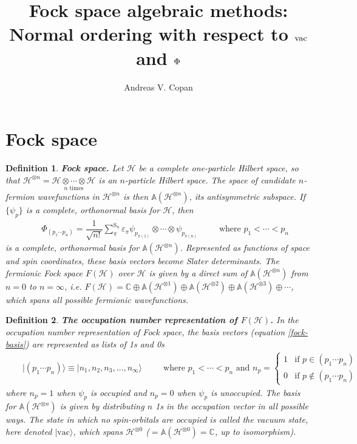\documentclass[11pt,fleqn]{article}
\author{Andreas V. Copan}
\date{}
\title{Fock space algebraic methods:\\Normal ordering with respect to $\vac$ and $\F$}
\newcommand{\e}{\varepsilon} %
\newcommand{\F}{\Phi}        %
\newcommand{\y}{\psi}        %
\newcommand{\vac}{\ensuremath{\mathrm{vac}}}
\renewcommand{\sp}{\hspace{30pt}}
\newcommand{\ld}{\ensuremath{\ldots}}
\newcommand{\cd}{\ensuremath{\cdots}}
\newcommand{\bmit}[1]{{\bfseries\itshape\mathversion{bold}#1}}
\newcommand{\mc}[1]{\ensuremath{\mathcal{#1}}}
\newcommand{\mb}[1]{\ensuremath{\mathbb{#1}}}
\newcommand{\mr}[1]{\ensuremath{\mathrm{#1}}}
\newcommand{\ts}{\textstyle}
\newcommand{\fr}[2]{\ensuremath{\dfrac{#1}{#2}}}
\newcommand{\kt}[1]{\ensuremath{|#1\rangle}}
\newcommand{\ar}[1]{\ensuremath{\begin{matrix}#1\end{matrix}}}
\theoremstyle{mystyle}
\newtheorem{dfn}{Definition}[section]
\numberwithin{equation}{section}
\begin{document}
\maketitle
\tableofcontents

\newpage
\section{Fock space}

\begin{dfn}
\label{fock-space}
\bmit{Fock space.}
Let $\mc{H}$ be a complete one-particle Hilbert space, so that $\mc{H}^{\otimes n}=\underset{\text{$n$ times}}{\mc{H}\otimes\cd\otimes\mc{H}}$ is an $n$-particle Hilbert space.
The space of candidate $n$-fermion wavefunctions in $\mc{H}^{\otimes n}$ is then $\mb{A}(\mc{H}^{\otimes n})$, its antisymmetric subspace.
If $\{\y_p\}$ is a complete, orthonormal basis for $\mc{H}$, then
\begin{align}
\label{fock-basis}
&&\ts
  \F_{(p_1\cd p_n)}
=
  \fr{1}{\sqrt{n!}}
  \sum_\pi^{\mr{S}_n}
  \e_{\pi}
  \y_{p_{\pi(1)}}\otimes\cd\otimes\y_{p_{\pi(n)}}
\sp
  \text{where }
  p_1<\cd<p_n
\end{align}
is a complete, orthonormal basis for $\mb{A}(\mc{H}^{\otimes n})$.
Represented as functions of space and spin coordinates, these basis vectors become Slater determinants.
The \textit{fermionic Fock space} $F(\mc{H})$ over $\mc{H}$ is given by a direct sum of $\mb{A}(\mc{H}^{\otimes n})$ from $n=0$ to $n=\infty$, i.e. $F(\mc{H})=\mb{C}\oplus \mb{A}(\mc{H}^{\otimes 1})\oplus\mb{A}(\mc{H}^{\otimes 2})\oplus\mb{A}(\mc{H}^{\otimes 3})\oplus\cd$, which spans all possible fermionic wavefunctions.
\end{dfn}

\begin{dfn}
\label{on-representation}
\bmit{The occupation number representation of $F(\mc{H})$.}
In the \textit{occupation number representation} of Fock space, the basis vectors (equation \ref{fock-basis}) are represented as lists of 1s and 0s
\begin{align}
\label{occupation-vector}
&&
  \kt{(p_1\cd p_n)}
\equiv
  \kt{n_1,n_2,n_3,\ld,n_{\infty}}
\sp\text{where }
  p_1<\cd<p_n
\text{ and }
  n_p
=
  \left\{\ar{
    1 & \text{if $p\in(p_1\cd p_n)$}\\
    0 & \text{if $p\notin(p_1\cd p_n)$}
  }\right.
\end{align}
where $n_p=1$ when $\y_p$ is occupied and $n_p=0$ when $\y_p$ is unoccupied.
The basis for $\mb{A}(\mc{H}^{\otimes n})$ is given by distributing $n$ 1s in the occupation vector in all possible ways.
The state in which no spin-orbitals are occupied is called the \textit{vacuum state}, here denoted $\kt{\vac}$, which spans $\mc{H}^{\otimes0}$ ($=\mb{A}(\mc{H}^{\otimes0})=\mb{C}$, up to isomorphism).
\end{dfn}
\end{document}
